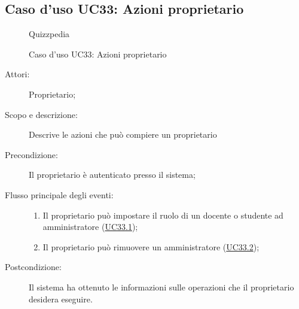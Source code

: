 \subsection{Caso d'uso UC33: Azioni proprietario}
        \begin{figure}[H]
            \centering
            \begin{resizedtikzpicture}{\textwidth}
		\begin{umlsystem}[x=0, fill=lightgray!20]{Quizzpedia}
		\end{umlsystem}
            \end{resizedtikzpicture}
            \caption{Caso d'uso UC33: Azioni proprietario}
            \label{fig:UC33} 
        \end{figure}
    \begin{description}
\item[Attori:] Proprietario;
\item[Scopo e descrizione:] Descrive le azioni che può compiere un proprietario
      \item[Precondizione:] Il proprietario è autenticato presso il sistema;

        \item[Flusso principale degli eventi:] \begin{enumerate}
          \item Il proprietario può impostare il ruolo di un docente o studente ad amministratore (\hyperlink{UC33.1}{UC33.1});
          \item Il proprietario può rimuovere un amministratore (\hyperlink{UC33.2}{UC33.2});

      \end{enumerate}
    \item[Postcondizione:] Il sistema ha ottenuto le informazioni sulle operazioni che il proprietario desidera eseguire.
  \end{description}
\hypertarget{UC33.1}{}
